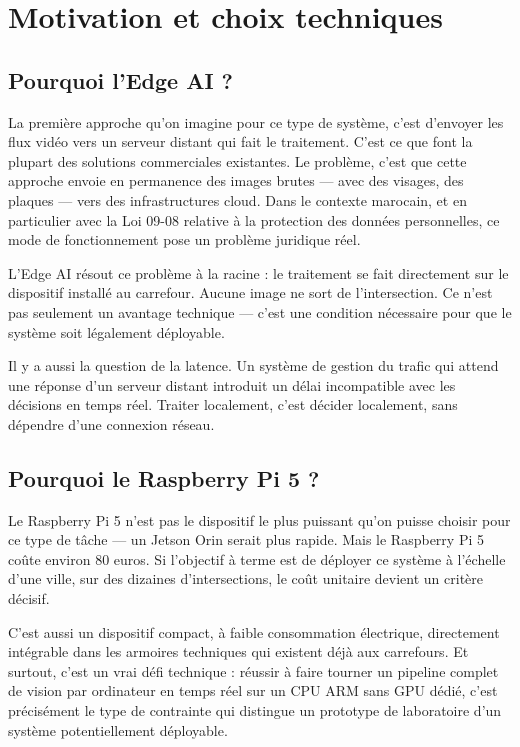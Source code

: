 \section{Motivation et choix techniques}

\subsection{Pourquoi l'Edge AI ?}

La première approche qu'on imagine pour ce
type de système, c'est d'envoyer les flux
vidéo vers un serveur distant qui fait le
traitement. C'est ce que font la plupart
des solutions commerciales existantes.
Le problème, c'est que cette approche
envoie en permanence des images brutes —
avec des visages, des plaques — vers des
infrastructures cloud. Dans le contexte
marocain, et en particulier avec la Loi 09-08
relative à la protection des données
personnelles, ce mode de fonctionnement
pose un problème juridique réel.

L'Edge AI résout ce problème à la racine :
le traitement se fait directement sur le
dispositif installé au carrefour. Aucune
image ne sort de l'intersection. Ce n'est
pas seulement un avantage technique — c'est
une condition nécessaire pour que le système
soit légalement déployable.

Il y a aussi la question de la latence.
Un système de gestion du trafic qui attend
une réponse d'un serveur distant introduit
un délai incompatible avec les décisions
en temps réel. Traiter localement, c'est
décider localement, sans dépendre d'une
connexion réseau.

\subsection{Pourquoi le Raspberry Pi 5 ?}

Le Raspberry Pi 5 n'est pas le dispositif
le plus puissant qu'on puisse choisir pour
ce type de tâche — un Jetson Orin serait
plus rapide. Mais le Raspberry Pi 5 coûte
environ 80 euros. Si l'objectif à terme
est de déployer ce système à l'échelle
d'une ville, sur des dizaines d'intersections,
le coût unitaire devient un critère décisif.

C'est aussi un dispositif compact, à faible
consommation électrique, directement
intégrable dans les armoires techniques
qui existent déjà aux carrefours. Et surtout,
c'est un vrai défi technique : réussir à
faire tourner un pipeline complet de vision
par ordinateur en temps réel sur un CPU ARM
sans GPU dédié, c'est précisément le type
de contrainte qui distingue un prototype
de laboratoire d'un système potentiellement
déployable.

